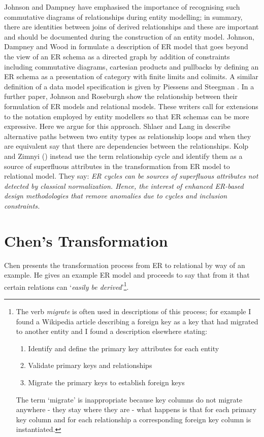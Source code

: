Johnson and Dampney \cite{Johnson93} have emphasised the 
importance of recognising such commutative diagrams of 
relationships during entity modelling; 
in summary, there are identities between joins of derived 
relationships and these are important
and should be documented during the construction of an entity model. 
Johnson, Dampney and Wood in \cite{Johnson2002ERA} formulate a description of 
ER model that goes beyond the view of an ER schema as a directed graph 
by addition of constraints including commutative diagrams, cartesian products and 
pullbacks by defining an ER schema as a presentation of category with 
finite limits and colimits.  
A similar definition of a data model specification is given by Piessens and Steegman \cite{piessens1995}.
In a further paper, Johnson and Roseburgh \cite{Johnson2002REL} show the 
relationship between their formulation of ER models and relational models. 
These writers call for extensions to the notation employed by entity modellers so that ER schemas can be more expressive. Here we argue for this approach.  
Shlaer and Lang in \cite{Shlaer96} describe alternative paths between two entity types as relationship loops and when they are equivalent say that there are dependencies between the relationships.  
Kolp and Zimnyi (\cite{Kolp1995}) instead use the term relationship cycle and identify them as a source of 
superfluous attributes in the transformation from ER model to relational model. They say: \textit{ER cycles can be sources of 
superfluous attributes not detected by classical normalization. Hence, the interest of enhanced ER-based design methodologies that remove anomalies due to cycles and inclusion constraints.}


\section{Chen's Transformation}
\label{ChensTransformation}

Chen presents the transformation process from ER to relational by way of an example. 
He gives an example ER model and proceeds to say that from it that certain relations can `\textit{easily be derived}'\footnote{The verb \textit{migrate} is often used in descriptions of this process; for example I found a Wikipedia article describing a foreign key as a key that had migrated to another entity and I found a description elsewhere stating:
\begin{enumerate}
\item {Identify and define the primary key attributes for each entity}
\item {Validate primary keys and relationships}
\item {Migrate the primary keys to establish foreign keys}
\end{enumerate} The term `migrate' is inappropriate because key columns do not migrate anywhere - they stay where they are - what happens is that for each primary key column and for each relationship a corresponding foreign key column is instantiated.
}. 

